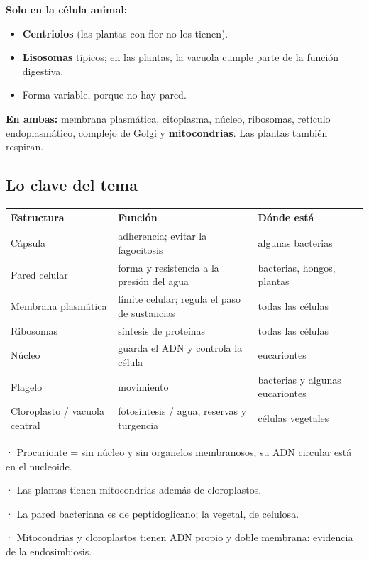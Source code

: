 \textbf{Solo en la célula animal:}

 
\begin{itemize}
  \item \textbf{Centriolos} (las plantas con flor no los tienen).
  \item \textbf{Lisosomas} típicos; en las plantas, la vacuola cumple parte de la función digestiva.
  \item Forma variable, porque no hay pared.
\end{itemize}
 

\textbf{En ambas:} membrana plasmática, citoplasma, núcleo, ribosomas, retículo endoplasmático, complejo de Golgi y \textbf{mitocondrias}. Las plantas también respiran.
\subsection{Lo clave del tema}
\begin{center}\small
\begin{tabularx}{\linewidth}{@{}>{\raggedright\arraybackslash\hsize=0.87\hsize}X>{\raggedright\arraybackslash\hsize=1.20\hsize}X>{\raggedright\arraybackslash\hsize=0.93\hsize}X@{}}
\toprule
\textbf{Estructura} & \textbf{Función} & \textbf{Dónde está} \\
\midrule
Cápsula & adherencia; evitar la fagocitosis & algunas bacterias \\
Pared celular & forma y resistencia a la presión del agua & bacterias, hongos, plantas \\
Membrana plasmática & límite celular; regula el paso de sustancias & todas las células \\
Ribosomas & síntesis de proteínas & todas las células \\
Núcleo & guarda el ADN y controla la célula & eucariontes \\
Flagelo & movimiento & bacterias y algunas eucariontes \\
Cloroplasto / vacuola central & fotosíntesis / agua, reservas y turgencia & células vegetales \\
\bottomrule
\end{tabularx}
\end{center}
 
\begin{clave}[{Recuerda}] · Procarionte = sin núcleo y sin organelos membranosos; su ADN circular está en el nucleoide.\par · Las plantas tienen mitocondrias además de cloroplastos.\par · La pared bacteriana es de peptidoglicano; la vegetal, de celulosa.\par · Mitocondrias y cloroplastos tienen ADN propio y doble membrana: evidencia de la endosimbiosis.\end{clave}
 
